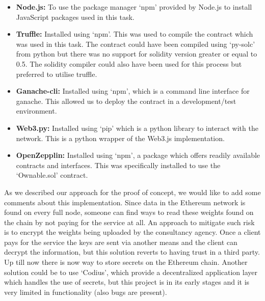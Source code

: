 \begin{itemize}
  \item \textbf{Node.js:} To use the package manager ‘npm’ provided by Node.js to install JavaScript packages used in this task.
  \item \textbf{Truffle:} Installed using ‘npm’. This was used to compile the contract which was used in this task. The contract could have been compiled using ‘py-solc’ from python but there was no support for solidity version greater or equal to 0.5. The solidity compiler could also have been used for this process but preferred to utilise truffle. 
  \item \textbf{Ganache-cli:} Installed using ‘npm’, which is a command line interface for ganache. This allowed us to deploy the contract in a development/test environment. 
  \item \textbf{Web3.py:} Installed using ‘pip’ which is a python library to interact with the network. This is a python wrapper of the Web3.js implementation. 
  \item \textbf{OpenZepplin:} Installed using ‘npm’, a package which offers readily available contracts and interfaces. This was specifically installed to use the ‘Ownable.sol’ contract. 
\end{itemize}

\noindent
As we described our approach for the proof of concept, we would like to add some comments about this implementation. Since data in the Ethereum network is found on every full node, someone can find ways to read these weights found on the chain by not paying for the service at all. An approach to mitigate such risk is to encrypt the weights being uploaded by the consultancy agency. Once a client pays for the service the keys are sent via another means and the client can decrypt the information, but this solution reverts to having trust in a third party. Up till now there is now way to store secrets on the Ethereum chain. Another solution could be to use ‘Codius’, which provide a decentralized application layer which handles the use of secrets, but this project is in its early stages and it is very limited in functionality (also bugs are present). 



